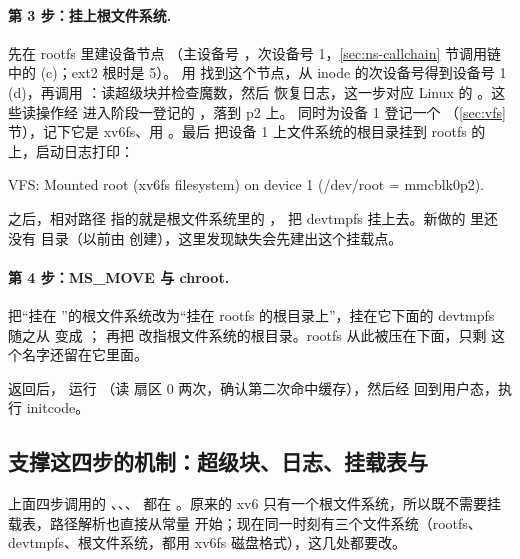 \paragraph{第 3 步：挂上根文件系统.} 先在 rootfs 里建设备节点 （主设备号 ，次设备号 1，\ref{sec:ns-callchain} 节调用链中的 (c)；ext2 根时是 5）。 用  找到这个节点，从 inode 的次设备号得到设备号 1 (d)，再调用 ：读超级块并检查魔数，然后  恢复日志，这一步对应 Linux 的 。这些读操作经  进入阶段一登记的 ，落到 p2 上。 同时为设备 1 登记一个 （\ref{sec:vfs} 节），记下它是 xv6fs、用 。最后  把设备 1 上文件系统的根目录挂到 rootfs 的  上，启动日志打印：

\begin{txtcode}
VFS: Mounted root (xv6fs filesystem) on device 1 (/dev/root = mmcblk0p2).
\end{txtcode}

 之后，相对路径  指的就是根文件系统里的 ， 把 devtmpfs 挂上去。新做的  里还没有  目录（以前由  创建），这里发现缺失会先建出这个挂载点。

\paragraph{第 4 步：MS\_MOVE 与 chroot.}  把“挂在 ”的根文件系统改为“挂在 rootfs 的根目录上”，挂在它下面的 devtmpfs 随之从  变成 ； 再把 \code{/} 改指根文件系统的根目录。rootfs 从此被压在下面，只剩  这个名字还留在它里面。

 返回后， 运行 （读  扇区 0 两次，确认第二次命中缓存），然后经  回到用户态，执行 initcode。

\subsection{支撑这四步的机制：超级块、日志、挂载表与 }
\label{sec:ns-mech}

上面四步调用的 、、、 都在 。原来的 xv6 只有一个根文件系统，所以既不需要挂载表，路径解析也直接从常量  开始；现在同一时刻有三个文件系统（rootfs、devtmpfs、根文件系统，都用 xv6fs 磁盘格式），这几处都要改。

